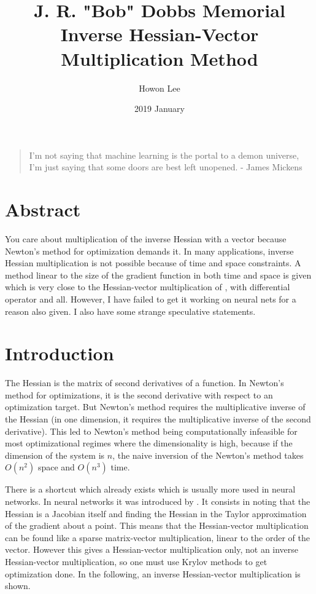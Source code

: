 \documentclass{article}
\begin{document}
\title{J. R. "Bob" Dobbs Memorial Inverse Hessian-Vector Multiplication Method}
\author{Howon Lee}
\date{2019 January}
\maketitle

\begin{quote}
I'm not saying that machine learning is the portal to a demon universe, I'm just saying that some doors are best left unopened. - James Mickens
\end{quote}

\section{Abstract}
You care about multiplication of the inverse Hessian with a vector because Newton's method for optimization demands it. In many applications, inverse Hessian multiplication is not possible because of time and space constraints. A method linear to the size of the gradient function in both time and space is given which is very close to the Hessian-vector multiplication of \cite{pearlmutter1994}, with differential operator and all. However, I have failed to get it working on neural nets for a reason also given. I also have some strange speculative statements.

\section{Introduction}

The Hessian is the matrix of second derivatives of a function. In Newton's method for optimizations, it is the second derivative with respect to an optimization target. But Newton's method requires the multiplicative inverse of the Hessian (in one dimension, it requires the multiplicative inverse of the second derivative). This led to Newton's method being computationally infeasible for most optimizational regimes where the dimensionality is high, because if the dimension of the system is $n$, the naive inversion of the Newton's method takes $O(n^2)$ space and $O(n^3)$ time.

There is a shortcut which already exists which is usually more used in neural networks. In neural networks it was introduced by \cite{pearlmutter1994}. It consists in noting that the Hessian is a Jacobian itself and finding the Hessian in the Taylor approximation of the gradient about a point. This means that the Hessian-vector multiplication can be found like a sparse matrix-vector multiplication, linear to the order of the vector. However this gives a Hessian-vector multiplication only, not an inverse Hessian-vector multiplication, so one must use Krylov methods to get optimization done\cite{martens2010}. In the following, an inverse Hessian-vector multiplication is shown.
\end{document}
